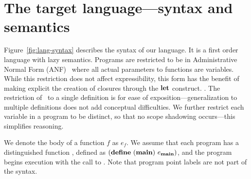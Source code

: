 \documentclass[preprint, 9pt]{sigplanconf}
\newcommand{\warning}[1]{{\color{Myred}{#1}}}
\begin{document}
\section{The target language---syntax and semantics}
\label{sec:defs}
Figure~\ref{fig:lang-syntax} describes the syntax  of our language. It
is a first order language with lazy semantics. Programs are restricted
to        be        in        Administrative        Normal        Form
(ANF)~\cite{chakravarty03perspective} where  all actual  parameters to
functions  are  variables.  While  this  restriction  does not  affect
expressibility,  this form  has  the benefit  of  making explicit  the
creation of  closures through  the $\LET$  construct.  \warning{ For
  now, we assume  $\LET$s  in our
language  are non-recursive;  in the  expression $\LET\,\,  x \leftarrow  s\,\,
\IN\,\, e$, $x$ should not occur in  $s$}. The  restriction of \LET\ to  a single
definition  is for  ease  of  exposition---generalization to  multiple
definitions does not add conceptual difficulties.  We further restrict
each variable in a program to  be distinct, so that no scope shadowing
occurs---this  simplifies  reasoning.  


We denote the body of a function ${\mathit  f}$   as $e_{\mathit f}$.
 We assume that each program has a distinguished function
\mainpgm,    defined as    $(\mbox{$\mathbf{define}$}\      ({\tt
  \mathbf{main}})\  e_{\mathbf{main}})$,  and  the program begins execution
with the call to \mainpgm.  Note that program point labels are not  part of the syntax.
\end{document}
